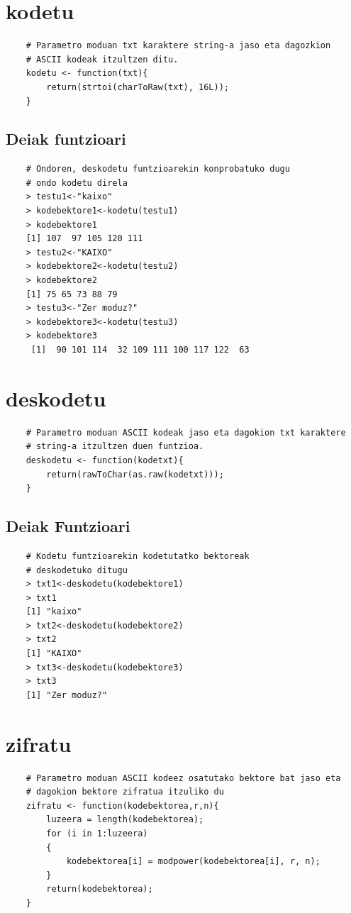 \documentclass[12pt]{basque-book}
\begin{document}
\newpage

\section{kodetu}
\begin{verbatim}
    # Parametro moduan txt karaktere string-a jaso eta dagozkion  
    # ASCII kodeak itzultzen ditu.
    kodetu <- function(txt){
        return(strtoi(charToRaw(txt), 16L));
    }
\end{verbatim}

\subsection{Deiak funtzioari}
\begin{verbatim}
    # Ondoren, deskodetu funtzioarekin konprobatuko dugu  
    # ondo kodetu direla
    > testu1<-"kaixo"
    > kodebektore1<-kodetu(testu1)
    > kodebektore1
    [1] 107  97 105 120 111
    > testu2<-"KAIXO"
    > kodebektore2<-kodetu(testu2)
    > kodebektore2
    [1] 75 65 73 88 79
    > testu3<-"Zer moduz?"
    > kodebektore3<-kodetu(testu3)
    > kodebektore3
     [1]  90 101 114  32 109 111 100 117 122  63
\end{verbatim}

\newpage

\section{deskodetu}
\begin{verbatim}
    # Parametro moduan ASCII kodeak jaso eta dagokion txt karaktere 
    # string-a itzultzen duen funtzioa.
    deskodetu <- function(kodetxt){
        return(rawToChar(as.raw(kodetxt)));
    }   
\end{verbatim}

\subsection{Deiak Funtzioari}
\begin{verbatim}
    # Kodetu funtzioarekin kodetutatko bektoreak 
    # deskodetuko ditugu
    > txt1<-deskodetu(kodebektore1)
    > txt1
    [1] "kaixo"
    > txt2<-deskodetu(kodebektore2)
    > txt2
    [1] "KAIXO"
    > txt3<-deskodetu(kodebektore3)
    > txt3
    [1] "Zer moduz?"
\end{verbatim}

\newpage

\section{zifratu}
\begin{verbatim}
    # Parametro moduan ASCII kodeez osatutako bektore bat jaso eta 
    # dagokion bektore zifratua itzuliko du
    zifratu <- function(kodebektorea,r,n){
        luzeera = length(kodebektorea);
        for (i in 1:luzeera)
        {
            kodebektorea[i] = modpower(kodebektorea[i], r, n);
        }
        return(kodebektorea);
    }
\end{verbatim}
\end{document}
